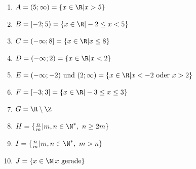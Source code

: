 \begin{Answer}[ref=mengenA1]

\begin{minipage}{\textwidth}
        \begin{enumerate}[label=\alph*)]
            \item \(A=(5;\infty)=\{x\in\R\vert x>5\}\)
            \item \(B=[-2;5)=\{x\in\R\vert -2\leq x<5\}\)
            \item \(C=(-\infty;8]=\{x\in\R\vert x\leq8\}\)
            \item \(D=(-\infty;2)=\{x\in\R\vert x<2\}\)
            \item \(E=(-\infty;-2)\text{ und }(2;\infty)=\{x\in\R\vert x<-2\text{ oder }x>2\}\)
            \item \(F=[-3;3]=\{x\in\R\vert -3\leq x\leq 3\}\)
            \item \(G=\R\setminus\Z\)
            \item \(H=\{\frac{n}{m}\vert m,n\in\N^*,\ n\geq 2m\}\)
            \item \(I=\{\frac{n}{m}\vert m,n\in\N^*,\ m>n\}\)
            \item \(J=\{x\in\N\vert x\text{ gerade}\}\)
        \end{enumerate}%
\end{minipage}%
\end{Answer}